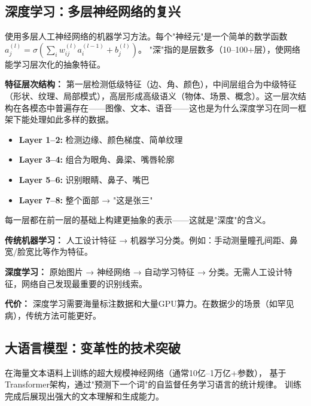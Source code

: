 \documentclass[11pt,a4paper]{ctexart}
\begin{document}
\subsection{深度学习：多层神经网络的复兴}

\begin{defbox}
使用多层人工神经网络的机器学习方法。每个"神经元"是一个简单的数学函数
$a_{j}^{(l)} = \sigma(\sum_i w_{ij}^{(l)} a_i^{(l-1)} + b_j^{(l)})$。
"深"指的是层数多（10--100+层），使网络能学习层次化的抽象特征。
\end{defbox}

\textbf{特征层次结构：} 第一层检测低级特征（边、角、颜色），中间层组合为中级特征（形状、纹理、局部模式），高层形成高级语义（物体、场景、概念）。这一层次结构在各模态中普遍存在——图像、文本、语音——这也是为什么深度学习在同一框架下能处理如此多样的数据。

\begin{exambox}
\begin{itemize}[nosep]
\item \textbf{Layer 1--2:} 检测边缘、颜色梯度、简单纹理
\item \textbf{Layer 3--4:} 组合为眼角、鼻梁、嘴唇轮廓
\item \textbf{Layer 5--6:} 识别眼睛、鼻子、嘴巴
\item \textbf{Layer 7--8:} 整个面部 → "这是张三"
\end{itemize}
每一层都在前一层的基础上构建更抽象的表示——这就是"深度"的含义。
\end{exambox}

\begin{exambox}
\textbf{传统机器学习：} 人工设计特征 → 机器学习分类。例如：手动测量瞳孔间距、鼻宽/脸宽比等作为特征。

\textbf{深度学习：} 原始图片 → 神经网络 → 自动学习特征 → 分类。无需人工设计特征，网络自己发现最重要的识别线索。

\textbf{代价：} 深度学习需要海量标注数据和大量GPU算力。在数据少的场景（如罕见病），传统方法可能更好。
\end{exambox}

\subsection{大语言模型：变革性的技术突破}

\begin{defbox}
在海量文本语料上训练的超大规模神经网络（通常10亿--1万亿+参数），
基于Transformer架构，通过"预测下一个词"的自监督任务学习语言的统计规律。
训练完成后展现出强大的文本理解和生成能力。
\end{defbox}
\end{document}
